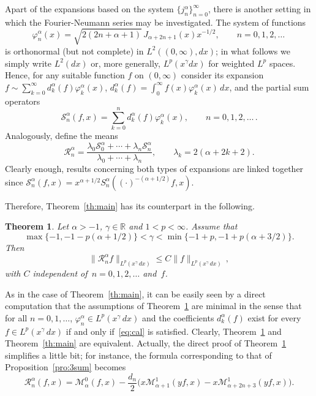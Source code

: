 \documentclass[a4paper]{amsart}
\newcommand{\calM}{\mathcal{M}}
\newcommand{\calR}{\mathcal{R}}
\newcommand{\calS}{\mathcal{S}}
\newtheorem{theor}{Theorem}
\begin{document}
Apart of the expansions based on the system $\{j_n^\alpha\}_{n=0}^\infty$, there
is another setting in which the Fourier-Neumann series may be  investigated.
The system of functions
\begin{equation*}
 \varphi_n^\alpha(x) = \sqrt{2(2n+\alpha+1)}\,J_{\alpha+2n+1}(x) x^{-1/2},
  \qquad n = 0,1,2,\dots\,
\end{equation*}
is orthonormal (but not complete) in
$L^2((0,\infty), dx)$; in what follows we simply write $L^2(dx)$ or, more generally,
$L^p(x^\gamma dx)$ for weighted $L^p$ spaces.
Hence, for any suitable function $f$ on $(0,\infty)$ consider its expansion
$f\sim\sum_{k=0}^\infty d_k^\alpha(f) \varphi_k^\alpha(x)$, $d_k^\alpha(f)=
\int_0^\infty f(x)\varphi_k^\alpha(x)\,dx$, and the partial sum operators
\begin{equation*}
  \calS_n^\alpha(f,x) = \sum_{k=0}^n d_k^\alpha(f) \varphi_k^\alpha(x),
  \qquad n = 0,1,2,\dots\,.
\end{equation*}
Analogously, define the means
\begin{equation*}
\label{eq:Rnacal}
  \calR_n^\alpha =
  \frac{\lambda_0 \calS_0^\alpha + \cdots + \lambda_n \calS_n^\alpha}
    {\lambda_0 + \cdots + \lambda_n},
  \qquad \lambda_k = 2(\alpha+2k+2).
\end{equation*}
Clearly enough, results concerning both types of expansions are linked together since
$\calS_n^\alpha(f,x) =x^{\alpha+1/2}S_n^\alpha((\cdot)^{-(\alpha+1/2)}f,x)$.

Therefore, Theorem~\ref{th:main} has its counterpart in the following.

\begin{theor}
\label{th:maincal}
Let $\alpha > -1$, $\gamma\in\mathbb{R}$ and $1<p<\infty$. Assume that
\begin{equation}
\label{eq:cal}
  \max\{-1,-1-p(\alpha+1/2)\} < \gamma < \min\{-1+p, -1+p(\alpha+3/2)\}.
\end{equation}
Then
\begin{equation*}
  \|\calR_n^\alpha f\|_{L^p(x^\gamma\,dx)} \le C \|f\|_{L^p(x^\gamma\,dx)}\,,
\end{equation*}
with $C$ independent of~$n=0,1,2,\dots$ and~$f$.
\end{theor}

As in the case of Theorem~\ref{th:main}, it can be easily seen by a direct computation
that the assumptions of Theorem~\ref{th:maincal} are minimal in the sense that
for all $n=0,1,\dots$, $\varphi_n^\alpha\in L^p(x^\gamma\,dx)$ and the coefficients
$ d_k^\alpha(f)$ exist for every $f\in L^p(x^\gamma\,dx)$ if and
only if~\eqref{eq:cal} is satisfied.
Clearly, Theorem~\ref{th:maincal} and Theorem~\ref{th:main} are equivalent.
Actually, the direct proof of Theorem~\ref{th:maincal} simplifies a little bit;
for instance, the formula corresponding
to that of Proposition~\ref{pro:3sum} becomes
$$
  \calR_n^\alpha(f,x) = \calM_{\alpha}^0(f,x)
  - \frac{d_n}{2} \Big(x\calM_{\alpha+1}^1(yf,x)-x
    \calM_{\alpha+2n+3}^1(yf,x)\Big).
$$
\end{document}
